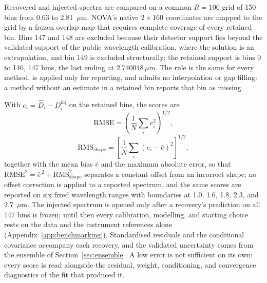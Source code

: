 Recovered and injected spectra are compared on a common $R=100$ grid of
150 bins from 0.63 to 2.81~$\mu\mathrm{m}$. NOVA's native $2\times160$
coordinates are mapped to the grid by a frozen overlap map that requires
complete coverage of every retained bin. Bins 147 and 148 are excluded
because their detector support lies beyond the validated support of the
public wavelength calibration, where the solution is an extrapolation,
and bin 149 is excluded structurally; the retained support is bins 0 to
146, 147 bins, the last ending at $2.740018\,\mu\mathrm{m}$. The rule is
the same for every method, is applied only for reporting, and admits no
interpolation or gap filling: a method without an estimate in a retained
bin reports that bin as missing.

With $e_i=\widehat D_i-D_i^{\mathrm{inj}}$ on the retained bins, the
scores are
\begin{equation}
 \mathrm{RMSE}=
 \left(\frac{1}{N}\sum_i e_i^2\right)^{1/2},
 \label{eq:absolute-rmse}
\end{equation}
\begin{equation}
 \mathrm{RMS}_{\mathrm{shape}}=
 \left[\frac{1}{N}\sum_i(e_i-\bar e)^2\right]^{1/2},
 \label{eq:morphology-rmse}
\end{equation}
together with the mean bias $\bar e$ and the maximum absolute error, so
that $\mathrm{RMSE}^2=\bar e^{\,2}+\mathrm{RMS}_{\mathrm{shape}}^2$
separates a constant offset from an incorrect shape; no offset
correction is applied to a reported spectrum, and the same scores are
reported on six fixed wavelength ranges with boundaries at 1.0, 1.6,
1.8, 2.3, and 2.7~$\mu\mathrm{m}$. The
injected spectrum is opened only after a recovery's prediction on all
147 bins is frozen; until then every calibration, modelling, and
starting choice rests on the data and the instrument references alone
(Appendix~\ref{app:benchmarking}). Standardised residuals and the
conditional covariance accompany each recovery, and the validated
uncertainty comes from the ensemble of Section~\ref{sec:ensemble}. A low
error is not sufficient on its own: every score is read alongside the
residual, weight, conditioning, and convergence diagnostics of the fit
that produced it.
